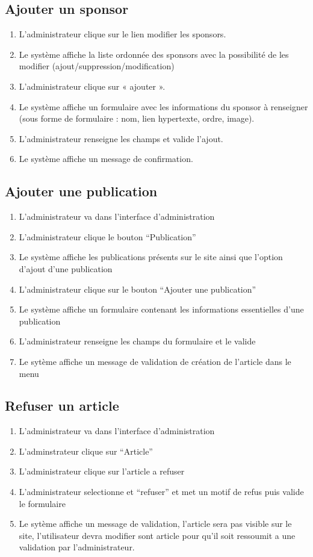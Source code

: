 \documentclass[a4paper,12pt, notitlepage]{report}
\begin{document}
\subsection{Ajouter un sponsor}
\begin{enumerate}
    \item{L'administrateur clique sur le lien modifier les sponsors.}
    \item{Le système affiche la liste ordonnée des sponsors avec la possibilité de les modifier (ajout/suppression/modification)}
    \item{L'administrateur clique sur « ajouter ».}
    \item{Le système affiche un formulaire avec les informations du sponsor à renseigner (sous forme de formulaire : nom, lien hypertexte, ordre, image).}
    \item{L'administrateur renseigne les champs et valide l'ajout.}
    \item{Le système affiche un message de confirmation.}
\end{enumerate}
\subsection{Ajouter une publication}
\begin{enumerate}
    \item L’administrateur va dans l’interface d’administration 
    \item L’administrateur clique le bouton “Publication”
    \item Le système affiche les publications présents sur le site ainsi que l’option d’ajout d’une publication
    \item L’administrateur clique sur le bouton “Ajouter une publication”
    \item Le système affiche un formulaire contenant les informations essentielles d’une publication
    \item L’administrateur renseigne les champs du formulaire et le valide
    \item Le sytème affiche un message de validation de création de l’article dans le menu
\end{enumerate}
\subsection{Refuser un article}
\begin{enumerate}
    \item L’administrateur va dans l’interface d’administration
    \item L’adminstrateur clique sur “Article”
    \item L’administrateur  clique sur l’article a refuser 
    \item L’administrateur selectionne et “refuser” et met un motif de refus puis valide le formulaire 
    \item Le sytème affiche un message de validation, l’article sera pas visible sur le site, l’utilisateur devra modifier sont article pour qu’il soit ressoumit a une validation par l’administrateur.
\end{enumerate}
\end{document}
